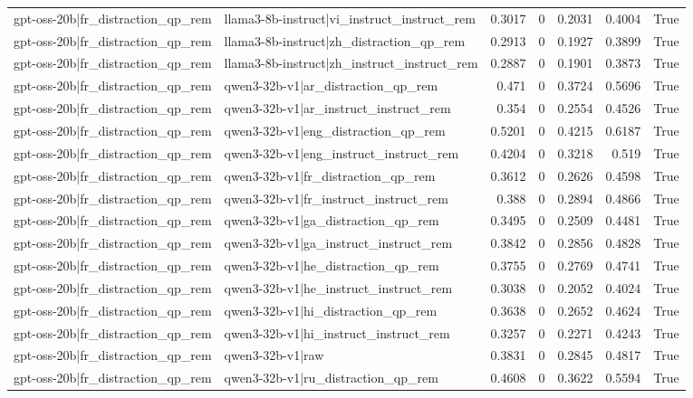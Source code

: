 \begin{table}
\begin{tabular}{l l r r r r l}
gpt-oss-20b|fr_distraction_qp_rem & llama3-8b-instruct|vi_instruct_instruct_rem & 0.3017 & 0 & 0.2031 & 0.4004 & True \\
gpt-oss-20b|fr_distraction_qp_rem & llama3-8b-instruct|zh_distraction_qp_rem & 0.2913 & 0 & 0.1927 & 0.3899 & True \\
gpt-oss-20b|fr_distraction_qp_rem & llama3-8b-instruct|zh_instruct_instruct_rem & 0.2887 & 0 & 0.1901 & 0.3873 & True \\
gpt-oss-20b|fr_distraction_qp_rem & qwen3-32b-v1|ar_distraction_qp_rem & 0.471 & 0 & 0.3724 & 0.5696 & True \\
gpt-oss-20b|fr_distraction_qp_rem & qwen3-32b-v1|ar_instruct_instruct_rem & 0.354 & 0 & 0.2554 & 0.4526 & True \\
gpt-oss-20b|fr_distraction_qp_rem & qwen3-32b-v1|eng_distraction_qp_rem & 0.5201 & 0 & 0.4215 & 0.6187 & True \\
gpt-oss-20b|fr_distraction_qp_rem & qwen3-32b-v1|eng_instruct_instruct_rem & 0.4204 & 0 & 0.3218 & 0.519 & True \\
gpt-oss-20b|fr_distraction_qp_rem & qwen3-32b-v1|fr_distraction_qp_rem & 0.3612 & 0 & 0.2626 & 0.4598 & True \\
gpt-oss-20b|fr_distraction_qp_rem & qwen3-32b-v1|fr_instruct_instruct_rem & 0.388 & 0 & 0.2894 & 0.4866 & True \\
gpt-oss-20b|fr_distraction_qp_rem & qwen3-32b-v1|ga_distraction_qp_rem & 0.3495 & 0 & 0.2509 & 0.4481 & True \\
gpt-oss-20b|fr_distraction_qp_rem & qwen3-32b-v1|ga_instruct_instruct_rem & 0.3842 & 0 & 0.2856 & 0.4828 & True \\
gpt-oss-20b|fr_distraction_qp_rem & qwen3-32b-v1|he_distraction_qp_rem & 0.3755 & 0 & 0.2769 & 0.4741 & True \\
gpt-oss-20b|fr_distraction_qp_rem & qwen3-32b-v1|he_instruct_instruct_rem & 0.3038 & 0 & 0.2052 & 0.4024 & True \\
gpt-oss-20b|fr_distraction_qp_rem & qwen3-32b-v1|hi_distraction_qp_rem & 0.3638 & 0 & 0.2652 & 0.4624 & True \\
gpt-oss-20b|fr_distraction_qp_rem & qwen3-32b-v1|hi_instruct_instruct_rem & 0.3257 & 0 & 0.2271 & 0.4243 & True \\
gpt-oss-20b|fr_distraction_qp_rem & qwen3-32b-v1|raw & 0.3831 & 0 & 0.2845 & 0.4817 & True \\
gpt-oss-20b|fr_distraction_qp_rem & qwen3-32b-v1|ru_distraction_qp_rem & 0.4608 & 0 & 0.3622 & 0.5594 & True \\

\end{tabular}
\end{table}
